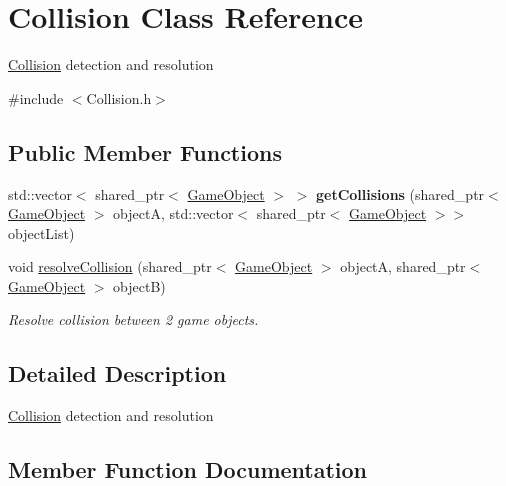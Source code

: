 \hypertarget{class_collision}{}\section{Collision Class Reference}
\label{class_collision}


\mbox{\hyperlink{class_collision}{Collision}} detection and resolution  




{\ttfamily \#include $<$Collision.\+h$>$}

\subsection*{Public Member Functions}
\begin{DoxyCompactItemize}
\item 
\mbox{\label{class_collision_a326e71d8960461f00b118f1688f61e81}} 
std\+::vector$<$ shared\+\_\+ptr$<$ \mbox{\hyperlink{class_game_object}{Game\+Object}} $>$ $>$ {\bfseries get\+Collisions} (shared\+\_\+ptr$<$ \mbox{\hyperlink{class_game_object}{Game\+Object}} $>$ objectA, std\+::vector$<$ shared\+\_\+ptr$<$ \mbox{\hyperlink{class_game_object}{Game\+Object}} $>$$>$ object\+List)
\item 
void \mbox{\hyperlink{class_collision_a9af0ec7e3829efcec43bf94e5911f1ae}{resolve\+Collision}} (shared\+\_\+ptr$<$ \mbox{\hyperlink{class_game_object}{Game\+Object}} $>$ objectA, shared\+\_\+ptr$<$ \mbox{\hyperlink{class_game_object}{Game\+Object}} $>$ objectB)
\begin{DoxyCompactList}\small\item\em Resolve collision between 2 game objects. \end{DoxyCompactList}\end{DoxyCompactItemize}


\subsection{Detailed Description}
\mbox{\hyperlink{class_collision}{Collision}} detection and resolution 



\subsection{Member Function Documentation}
\mbox{\label{class_collision_a9af0ec7e3829efcec43bf94e5911f1ae}} 
